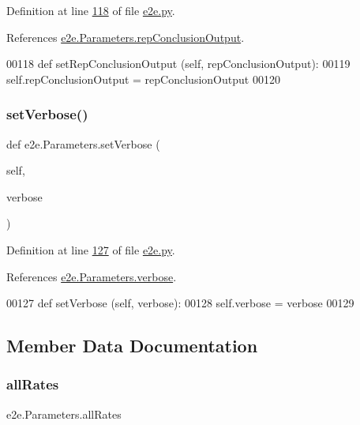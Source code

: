 Definition at line \hyperlink{e2e_8py_source_l00118}{118} of file \hyperlink{e2e_8py_source}{e2e.\+py}.



References \hyperlink{e2e_8py_source_l00039}{e2e.\+Parameters.\+rep\+Conclusion\+Output}.


\begin{DoxyCode}
00118     \textcolor{keyword}{def }setRepConclusionOutput (self, repConclusionOutput):
00119         self.repConclusionOutput = repConclusionOutput
00120     
\end{DoxyCode}
\mbox{\label{classe2e_1_1_parameters_a9d1ef6cf9aaac08105966db43687423f}} 
\subsubsection{\texorpdfstring{set\+Verbose()}{setVerbose()}}
{\footnotesize\ttfamily def e2e.\+Parameters.\+set\+Verbose (\begin{DoxyParamCaption}\item[{}]{self,  }\item[{}]{verbose }\end{DoxyParamCaption})}



Definition at line \hyperlink{e2e_8py_source_l00127}{127} of file \hyperlink{e2e_8py_source}{e2e.\+py}.



References \hyperlink{e2e_8py_source_l00041}{e2e.\+Parameters.\+verbose}.


\begin{DoxyCode}
00127     \textcolor{keyword}{def }setVerbose (self, verbose):
00128         self.verbose = verbose
00129 
\end{DoxyCode}


\subsection{Member Data Documentation}
\mbox{\label{classe2e_1_1_parameters_a60eeea35185af8b13a6ea9d797a38dc7}} 
\subsubsection{\texorpdfstring{all\+Rates}{allRates}}
{\footnotesize\ttfamily e2e.\+Parameters.\+all\+Rates}



